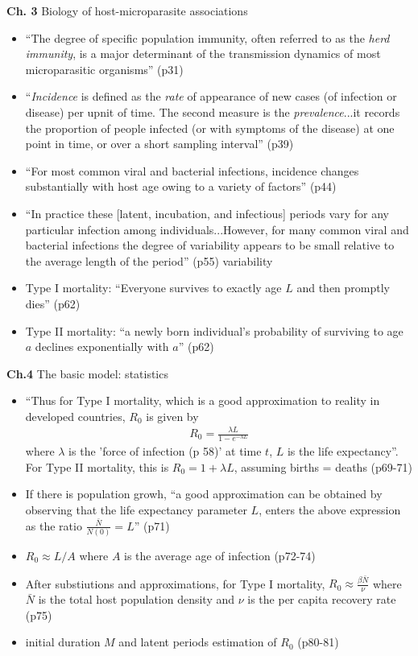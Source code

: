 \documentclass{article}
\begin{document}
\textbf{Ch. 3} Biology of host-microparasite associations
\begin{itemize}
\item ``The degree of specific population immunity, often referred to as the \textit{herd immunity}, is a major determinant of the transmission dynamics of most microparasitic organisms'' (p31)
\item ``\textit{Incidence} is defined as the \textit{rate} of appearance of new cases (of infection or disease) per upnit of time.  The second measure is the \textit{prevalence}...it records the proportion of people infected (or with symptoms of the disease) at one point in time, or over a short sampling interval'' (p39)
\item ``For most common viral and bacterial infections, incidence changes substantially with host age owing to a variety of factors'' (p44)
\item ``In practice these [latent, incubation, and infectious] periods vary for any particular infection among individuals...However, for many common viral and bacterial infections the degree of variability appears to be small relative to the average length of the period'' (p55) variability

\item Type I mortality:  ``Everyone survives to exactly age $L$ and then promptly dies'' (p62)
\item Type II mortality: ``a newly born individual's probability of surviving to age $a$ declines exponentially with $a$'' (p62)
\end{itemize}

\textbf{Ch.4} The basic model: statistics
\begin{itemize}
\item ``Thus for Type I mortality, which is a good approximation to reality in developed countries, $R_0$ is given by
\begin{align*}
R_0 = \frac{ \lambda L}{1 - e^{- \lambda L}}
\end{align*}
where $\lambda$ is the 'force of infection (p 58)' at time $t$, $L$ is the life expectancy''.  For Type II mortality, this is $R_0 = 1 + \lambda L$, assuming births = deaths (p69-71)
\item If there is population growh, ``a good approximation can be obtained by observing that the life expectancy parameter $L$, enters the above expression as the ratio $\frac{\bar{N}}{N(0)} = L$'' (p71)
\item $R_0 \approx L/A$ where $A$ is the average age of infection (p72-74)
\item After substiutions and approximations, for Type I mortality, $R_0 \approx \frac{\beta \bar{N}}{\nu}$ where $\bar{N}$ is the total host population density and $\nu$ is the per capita recovery rate (p75)
\item initial duration $M$ and latent periods estimation of $R_0$ (p80-81)
\end{itemize}
\end{document}
